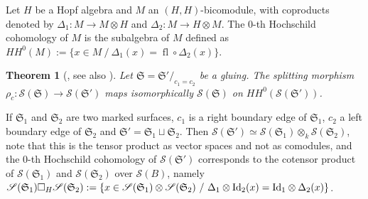 \documentclass[pdftex]{sigma}%
\numberwithin{equation}{section}
\newtheorem{Theorem}{Theorem}[section]
\begin{document}
\begin{Definition}
Let $H$ be a Hopf algebra and $M$ an $(H,H)$-bicomodule, with coproducts denoted by $\Delta_1\colon M \to M \otimes H$ and $\Delta_2\colon M \to H \otimes M$. The 0-th Hochschild cohomology of $M$ is the subalgebra of $M$ defined as $HH^0(M) := \{ x \in M\ /\ \Delta_1 (x) = \operatorname{fl}\circ\Delta_2 (x)\}$.
\end{Definition}
\begin{Theorem}[{\cite[Section~2.3]{KorQue}, see also \cite[Theorem~4.8]{Cos}}] \label{thmExcOfSS}
Let $\mathfrak{S} = \mathfrak{S}'/_{c_1 = c_2}$ be a gluing. The splitting morphism $\rho_c\colon \mathscr{S}(\mathfrak{S}) \to \mathscr{S}(\mathfrak{S}')$ maps isomorphically $\mathscr{S}(\mathfrak{S})$ on $HH^0(\mathscr{S}(\mathfrak{S}'))$.
\end{Theorem}
\begin{Remark}
If $\mathfrak{S}_1$ and $\mathfrak{S}_2$ are two marked surfaces, $c_1$ is a right boundary edge of $\mathfrak{S}_1$, $c_2$ a left boundary edge of $\mathfrak{S}_2$ and $\mathfrak{S}' = \mathfrak{S}_1 \sqcup \mathfrak{S}_2$. Then $\mathscr{S}(\mathfrak{S}') \simeq \mathscr{S}(\mathfrak{S}_1)\otimes_k \mathscr{S}(\mathfrak{S}_2)$, note that this is the tensor product as vector spaces and not as comodules, and the 0-th Hochschild cohomology of $\mathscr{S}(\mathfrak{S}')$ corresponds to the cotensor product of $\mathscr{S}(\mathfrak{S}_1)$ and $\mathscr{S}(\mathfrak{S}_2)$ over $\mathscr{S}(B)$, namely $\mathscr{S}(\mathfrak{S}_1) \square_H \mathscr{S}(\mathfrak{S}_2) := \{ x \in \mathscr{S}(\mathfrak{S}_1)\otimes \mathscr{S}(\mathfrak{S}_2)\ /\ \Delta_1 \otimes {\rm Id}_2 (x) = {\rm Id}_1 \otimes \Delta_2 (x)\}$.
\end{Remark}
\end{document}
